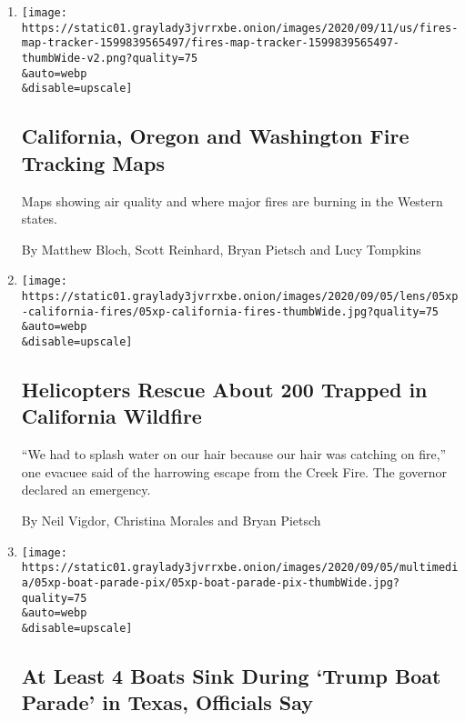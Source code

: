 \begin{enumerate}
\def\labelenumi{\arabic{enumi}.}
\item
  \href{/interactive/2020/us/fires-map-tracker.html}{}

  \texttt{[image: https://static01.graylady3jvrrxbe.onion/images/2020/09/11/us/fires-map-tracker-1599839565497/fires-map-tracker-1599839565497-thumbWide-v2.png?quality=75\\\&auto=webp\\\&disable=upscale]}

  \hypertarget{california-oregon-and-washington-fire-tracking-maps}{%
  \subsection{California, Oregon and Washington Fire Tracking
  Maps}\label{california-oregon-and-washington-fire-tracking-maps}}

  Maps showing air quality and where major fires are burning in the
  Western states.

  By Matthew Bloch, Scott Reinhard, Bryan Pietsch and Lucy Tompkins
\item
  \href{/2020/09/06/us/mammoth-pools-fires-california.html}{}

  \texttt{[image: https://static01.graylady3jvrrxbe.onion/images/2020/09/05/lens/05xp-california-fires/05xp-california-fires-thumbWide.jpg?quality=75\\\&auto=webp\\\&disable=upscale]}

  \hypertarget{helicopters-rescue-about-200-trapped-in-california-wildfire}{%
  \subsection{Helicopters Rescue About 200 Trapped in California
  Wildfire}\label{helicopters-rescue-about-200-trapped-in-california-wildfire}}

  ``We had to splash water on our hair because our hair was catching on
  fire,'' one evacuee said of the harrowing escape from the Creek Fire.
  The governor declared an emergency.

  By Neil Vigdor, Christina Morales and Bryan Pietsch
\item
  \href{/2020/09/05/us/Texas-boat-parade-trump.html}{}

  \texttt{[image: https://static01.graylady3jvrrxbe.onion/images/2020/09/05/multimedia/05xp-boat-parade-pix/05xp-boat-parade-pix-thumbWide.jpg?quality=75\\\&auto=webp\\\&disable=upscale]}

  \hypertarget{at-least-4-boats-sink-during-trump-boat-parade-in-texas-officials-say}{%
  \subsection{At Least 4 Boats Sink During `Trump Boat Parade' in Texas,
  Officials
  Say}\label{at-least-4-boats-sink-during-trump-boat-parade-in-texas-officials-say}}


\end{enumerate}
